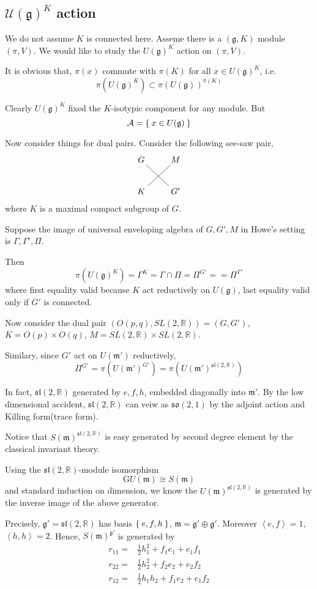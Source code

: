 \documentclass[12pt]{article}
\makeatletter
\def\bR{{\mathbb{R}}}
\def\inn#1#2{\left\langle{#1},{#2}\right\rangle}
\def\asl{\mathfrak{sl}}
\def\aso{\mathfrak{so}}
\def\fgg{\mathfrak{g}}
\def\caa{\mathcal{A}}
\def\cuu{\mathcal{U}}
\def\fmm{\mathfrak{m}}
\def\Gr{\mathrm{G}}
\def\seesawpair#1#2#3#4{
\xymatrix{
{#1} \ar@{-}[dr]& {#2} \\
{#3} \ar@{-}[ur] & {#4}}
}
\makeatother
\begin{document}
\subsection{$\cuu(\fgg)^K$ action}
We do not assume $K$ is connected here.  
Asseme there is a $(\fgg,K)$ module $(\pi,V)$.
We would like to study the $U(\fgg)^K$ action on $(\pi,V)$. 

It is obvious that, 
$\pi(x)$ commute with $\pi(K)$ for all $x \in U(\fgg)^K$, i.e. 
\[
\pi(U(\fgg)^K) \subset \pi(U(\fgg))^{\pi(K)}
\]


Clearly $U(\fgg)^K$ fixed the $K$-isotypic component for any module.
But 
\[
\caa =\Set{x\in U(\fgg)}
\]

Now consider things for dual pairs.
Consider the following see-saw pair, 
\[
\seesawpair{G}{M}{K}{G'}
\]
where $K$ is a maximal compact subgroup of $G$. 

Suppose the image of universal enveloping algebra of $G,G',M$
in Howe's setting \cite{Howe1989Rem} is $\Gamma,\Gamma', \Pi$.

Then
\[
\pi(U(\fgg)^K) = \Gamma^K = \Gamma \cap \Pi = \Pi^{G'} ==\Pi^{\Gamma'}
\]
where first equality valid because $K$ act reductively on $U(\fgg)$,
last equality valid only if $G'$ is connected.


Now consider the dual pair $(O(p,q),SL(2,\bR))=(G,G')$,
$K = O(p)\times O(q)$, $M=SL(2,\bR) \times SL(2,\bR)$.

Similary, since $G'$ act on $U(\fmm')$ reductively, 
\[
\Pi^{G'} = \pi(U(\fmm')^{G'}) = \pi(U(\fmm')^{\asl(2,\bR)})
\]

In fact, $\asl(2,\bR)$ generated by $e,f,h$, embedded diagonally into 
$\fmm'$. 
By the low dimensional accident, $\asl(2,\bR)$ can veiw as $\aso(2,1)$
by the adjoint action and Killing form(trace form). 

Notice that $S(\fmm)^{\asl(2,\bR)}$ is easy generated by second degree element
by the classical invariant theory. 
 
Using the $\asl(2,\bR)$-module isomorphism 
\[
\Gr U(\fmm) \cong S(\fmm)
\]
and standard induction on dimension, we know the $U(\fmm)^{\asl(2,\bR)}$
is generated by  the inverse image of the above generator.

Precisely, $\fgg'=\asl(2,\bR)$ has basis $\Set{e,f,h}$, 
$\fmm = \fgg'\oplus \fgg'$.
Moreover $\inn{e}{f} = 1$, $\inn{h}{h}=2$.  
Hence, $S(\fmm)^{\fgg'}$ is generated by 
\begin{align*}
r_{11} = & \frac{1}{2} h_1^2 + f_1e_1 + e_1f_1 \\
r_{22} = & \frac{1}{2} h_2^2 + f_2e_2 + e_2f_2 \\
r_{12} = & \frac{1}{2} h_1h_2 + f_1e_2 + e_1f_2  
\end{align*}
\end{document}
